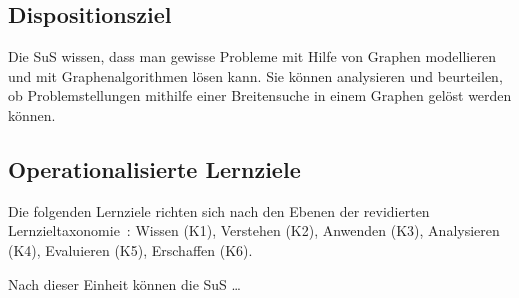 \subsection{Dispositionsziel}

Die SuS wissen, dass man gewisse Probleme mit Hilfe von Graphen modellieren und mit Graphenalgorithmen lösen kann. 
Sie können analysieren und beurteilen, ob Problemstellungen mithilfe einer Breitensuche in einem Graphen gelöst werden können.



\subsection{Operationalisierte Lernziele}

Die folgenden Lernziele richten sich nach den Ebenen der revidierten Lernzieltaxonomie~\cite{krathwohl}: Wissen (K1), Verstehen (K2), Anwenden (K3), Analysieren (K4), Evaluieren (K5), Erschaffen (K6).

Nach dieser Einheit können die SuS \dots

